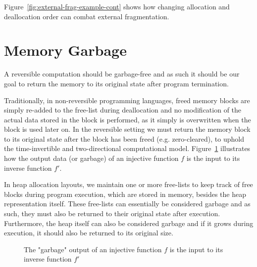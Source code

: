 Figure~\ref{fig:external-frag-example-cont} shows how changing allocation and deallocation order can combat external fragmentation.


\section{Memory Garbage}
\label{sec:memory-garbage}
A reversible computation should be garbage-free and as such it should be our goal to return the memory to its original state after program termination.

Traditionally, in non-reversible programming languages, freed memory blocks are simply re-added to the free-list during deallocation and no modification of the actual data stored in the block is performed, as it simply is overwritten when the block is used later on. In the reversible setting we must return the memory block to its original state after the block has been freed (e.g. zero-cleared), to uphold the time-invertible and two-directional computational model. Figure~\ref{fig:injective-garbage-in-out} illustrates how the output data (or garbage) of an injective function $f$ is the input to its inverse function $f'$.

In heap allocation layouts, we maintain one or more free-lists to keep track of free blocks during program execution, which are stored in memory, besides the heap representation itself. These free-lists can essentially be considered garbage and as such, they must also be returned to their original state after execution. Furthermore, the heap itself can also be considered garbage and if it grows during execution, it should also be returned to its original size.

\begin{figure}[ht]
  \centering
    \caption{The "garbage" output of an injective function $f$ is the input to its inverse function $f'$}
    \label{fig:injective-garbage-in-out}
\end{figure}

